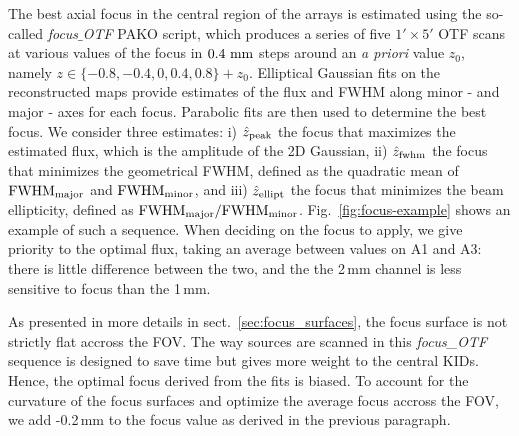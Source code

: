 The best axial focus in the central region of the arrays is estimated using the
so-called \emph{focus$\_$OTF} PAKO script, which produces a series of five $1'
\times 5'$ OTF scans at various values of the focus in $0.4~\rm{mm}$ steps
around an \emph{a priori} value $z_0$, namely $z \in \{-0.8, -0.4, 0, 0.4, 0.8\}
+ z_0$. Elliptical Gaussian fits on the reconstructed maps provide estimates of
the flux and FWHM along minor - and major - axes for each focus. Parabolic fits are
then used to determine the best focus. We consider three estimates: i) $\hat
z_{\rm{peak}}$ the focus that maximizes the estimated flux, which is the
amplitude of the 2D Gaussian, ii) $\hat z_{\rm{fwhm}}$ the focus that minimizes
the geometrical FWHM, defined as the quadratic mean of $\rm{FWHM}_{\rm{major}}$
and $\rm{FWHM}_{\rm{minor}}$, and iii) $\hat z_{\rm{ellipt}}$ the focus that
minimizes the beam ellipticity, defined as
$\rm{FWHM}_{\rm{major}}/\rm{FWHM}_{\rm{minor}}$. Fig.~\ref{fig:focus-example}
shows an example of such a sequence. When deciding on the focus to apply, we
give priority to the optimal flux, taking an average between values on A1 and
A3: there is little difference between the two, and the the 2\,mm channel is
less sensitive to focus than the 1\,mm.

As presented in more details in sect.~\ref{sec:focus_surfaces}, the focus
surface is not strictly flat accross the FOV. The way sources are scanned in
this \emph{focus\_OTF} sequence is designed to save time but gives more weight
to the central KIDs. Hence, the optimal focus derived from the fits is
biased. To account for the curvature of the focus surfaces and optimize the
average focus accross the FOV, we add -0.2\,mm to the focus value as derived
in the previous paragraph.

